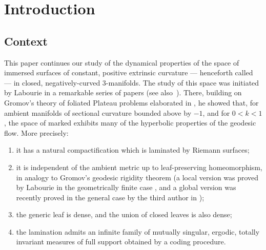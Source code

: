 \section{Introduction}

\subsection{Context}
This paper continues our study of the dynamical properties of the space of immersed surfaces of constant, positive extrinsic curvature --- henceforth called \ksurfaces --- in closed, negatively-curved $3$\nobreakdash-manifolds. The study of this space was initiated by Labourie in a remarkable series of papers \cite{LabourieGAFA,LabourieInvent,LabourieAnnals} (see also~\cite{Labourie_phase_space}). There, building on Gromov's theory of foliated Plateau problems elaborated in \hbox{\cite{Gromov_FolPlateau1,Gromov_FolPlateau2}}, he showed that, for ambient manifolds of sectional curvature bounded above by $-1$, and for $0<k<1$, the space of marked \ksurfaces exhibits many of the hyperbolic properties of the geodesic flow. More precisely:
\begin{enumerate}
\item it has a natural compactification which is laminated by Riemann surfaces;
\item it is independent of the ambient metric up to leaf-preserving homeomorphism, in analogy to Gromov's geodesic rigidity theorem \cite{Gromov3} (a local version was proved by Labourie in the geometrically finite case \cite{LabourieInvent}, and a global version was recently proved in the general case by the third author in \cite{Smith_asymp});
\item the generic leaf is dense, and the union of closed leaves is also dense;
\item the lamination admits an infinite family of mutually singular, ergodic, totally invariant measures of full support obtained by a coding procedure.
\end{enumerate}

